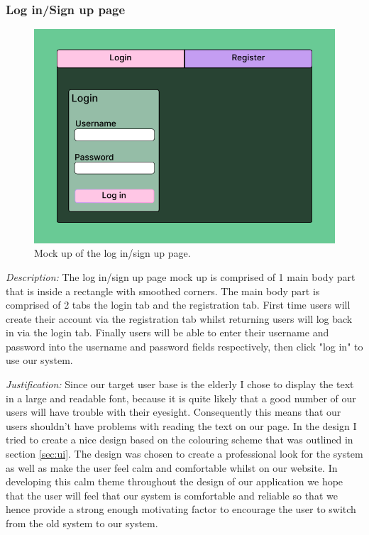 \subsubsection{Log in/Sign up page}

\begin{figure}[H]
\centering

\includegraphics[scale=0.2]{Images/Login_Page_1.png}

\caption{Mock up of the log in/sign up page.}
\label{fig:login}
\end{figure}

\textit{Description:}
The log in/sign up page mock up is comprised of 1 main
body part that is inside a rectangle with smoothed corners.
The main body part is comprised of 2 tabs the login tab and
the registration tab. First time users will create their 
account via the registration tab whilst returning users will
log back in via the login tab. Finally users will be able to 
enter their username and password into the username and 
password fields respectively, then click "log in" to use our
system.
\\ \vspace{0.2cm}

\textit{Justification:}
Since our target user base is the elderly I chose to display 
the text in a large and readable font, because it is quite 
likely that a good number of our users will have trouble 
with their eyesight. Consequently this means that our 
users shouldn't have problems with reading the text on our 
page. In the design I tried to create a nice design based on 
the colouring scheme that was outlined in section \ref{sec:ui}.
The design was chosen to create a professional look for the 
system as well as make the user feel calm and comfortable 
whilst on our website. In developing this calm theme 
throughout the design of our application we hope that 
the user will feel that our system is comfortable and 
reliable so that we hence provide a strong enough
motivating factor to encourage the user to switch from
the old system to our system.

